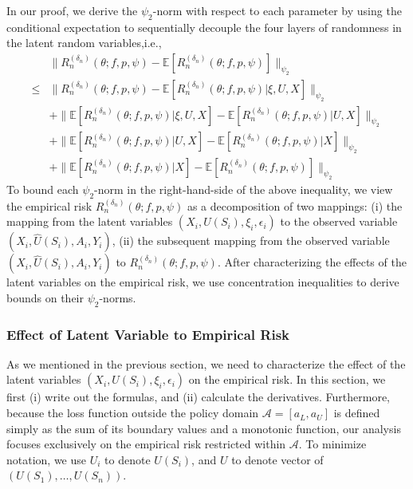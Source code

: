 \documentclass[12pt]{article}
\newcommand{\E}{\mathbb{E}}
\begin{document}
In our proof, we derive the $\psi_2$-norm with respect to each parameter by using the conditional expectation to sequentially decouple the four layers of randomness in the latent random variables,i.e.,
 \begin{align}
     &\|R_n^{(\delta_n)}(\theta;f,p,\psi)-\E[R_n^{(\delta_n)}(\theta;f,p,\psi)]\|_{\psi_2}\label{ref:randomness_decomposition}\\
     \leq & \|R_n^{(\delta_n)}(\theta;f,p,\psi)-\E[R_n^{(\delta_n)}(\theta;f,p,\psi)|\xi,U,X]\|_{\psi_2}\nonumber\\
     &+\|\E[R_n^{(\delta_n)}(\theta;f,p,\psi)|\xi,U,X]-\E[R_n^{(\delta_n)}(\theta;f,p,\psi)|U,X]\|_{\psi_2}\nonumber\\
     &+ \|\E[R_n^{(\delta_n)}(\theta;f,p,\psi)|U,X]-\E[R_n^{(\delta_n)}(\theta;f,p,\psi)|X]\|_{\psi_2}\nonumber\\
      &+ \|\E[R_n^{(\delta_n)}(\theta;f,p,\psi)|X]-\E[R_n^{(\delta_n)}(\theta;f,p,\psi)]\|_{\psi_2}\nonumber
 \end{align}
To bound each $\psi_2$-norm in the right-hand-side of the above inequality, we view the empirical risk $R_n^{(\delta_n)}(\theta;f,p,\psi)$ as a decomposition of two mappings: (i) the mapping from the latent variables $(X_i,U(S_i),\xi_i,\epsilon_i)$ to the observed variable $(X_i,\widehat U(S_i),A_i,Y_i)$, (ii) the subsequent mapping from the observed variable $(X_i,\widehat U(S_i),A_i,Y_i)$ to $R_n^{(\delta_n)}(\theta;f,p,\psi)$. After characterizing the effects of the latent variables on the empirical risk, we use concentration inequalities to derive bounds on their $\psi_2$-norms.

\subsubsection{Effect of Latent Variable to Empirical Risk}\label{sec:formula_derivatives_latent}

As we mentioned in the previous section, we need to characterize the effect of the latent variables $(X_i,U(S_i),\xi_i,\epsilon_i)$ on the empirical risk. In this section, we first (i) write out the formulas, and (ii) calculate the derivatives. Furthermore, because the loss function outside the policy domain $\mathcal{A}=[a_L,a_U]$ is defined simply as the sum of its boundary values and a monotonic function, our analysis focuses exclusively on the empirical risk restricted within $\mathcal{A}$. To minimize notation, we use $U_i$ to denote $U(S_i)$, and $U$ to denote vector of $(U(S_1),\ldots,U(S_n))$.
\end{document}
